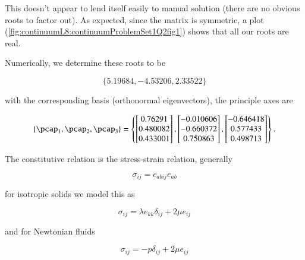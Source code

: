 \begin{Answer}[ref={problem:strain:ps1q2a}]
This doesn't appear to lend itself easily to manual solution (there are no obvious roots to factor out).  As expected, since the matrix is symmetric, a plot (\ref{fig:continuumL8:continuumProblemSet1Q2fig1}) shows that all our roots are real.


Numerically, we determine these roots to be

\begin{equation}\label{eqn:continuumProblemSet1:310}
\{5.19684, -4.53206, 2.33522\}
\end{equation}

with the corresponding basis (orthonormal eigenvectors), the principle axes are

\begin{equation}\label{eqn:continuumProblemSet1:330}
\left\{
\pcap_1,
\pcap_2,
\pcap_3
\right\}
=
\left\{
\begin{bmatrix}
0.76291 \\
0.480082 \\
0.433001
\end{bmatrix},
\begin{bmatrix}
-0.010606 \\
-0.660372 \\
0.750863
\end{bmatrix},
\begin{bmatrix}
-0.646418 \\
0.577433 \\
0.498713
\end{bmatrix}
\right\}.
\end{equation}

\end{Answer}

\begin{Exercise}[
title={What is meant by \textit{constitutive relation}?},
label={problem:fluids:midterm:1b}
]
\end{Exercise}

\begin{Answer}[ref={problem:fluids:midterm:1b}]
The constitutive relation is the stress-strain relation, generally

\begin{equation}\label{eqn:continuumMidTermReflection:150}
\sigma_{ij} = c_{abij} e_{ab}
\end{equation}

for isotropic solids we model this as 

\begin{equation}\label{eqn:continuumMidTermReflection:170}
\sigma_{ij} = \lambda e_{kk} \delta_{ij} + 2 \mu e_{ij}
\end{equation}

and for Newtonian fluids

\begin{equation}\label{eqn:continuumMidTermReflection:190}
\sigma_{ij} = -p \delta_{ij} + 2 \mu e_{ij}
\end{equation}
\end{Answer}

